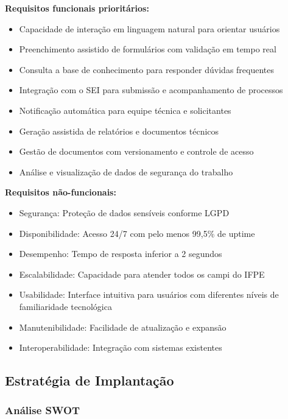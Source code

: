 \documentclass[12pt,a4paper]{article}
\begin{document}
\textbf{Requisitos funcionais prioritários:}

\begin{itemize}
    \item Capacidade de interação em linguagem natural para orientar usuários
    \item Preenchimento assistido de formulários com validação em tempo real
    \item Consulta a base de conhecimento para responder dúvidas frequentes
    \item Integração com o SEI para submissão e acompanhamento de processos
    \item Notificação automática para equipe técnica e solicitantes
    \item Geração assistida de relatórios e documentos técnicos
    \item Gestão de documentos com versionamento e controle de acesso
    \item Análise e visualização de dados de segurança do trabalho
\end{itemize}

\textbf{Requisitos não-funcionais:}

\begin{itemize}
    \item Segurança: Proteção de dados sensíveis conforme LGPD
    \item Disponibilidade: Acesso 24/7 com pelo menos 99,5\% de uptime
    \item Desempenho: Tempo de resposta inferior a 2 segundos
    \item Escalabilidade: Capacidade para atender todos os campi do IFPE
    \item Usabilidade: Interface intuitiva para usuários com diferentes níveis de familiaridade tecnológica
    \item Manutenibilidade: Facilidade de atualização e expansão
    \item Interoperabilidade: Integração com sistemas existentes
\end{itemize}

\clearpage
\subsection{Estratégia de Implantação}

\subsubsection{Análise SWOT}
\end{document}
